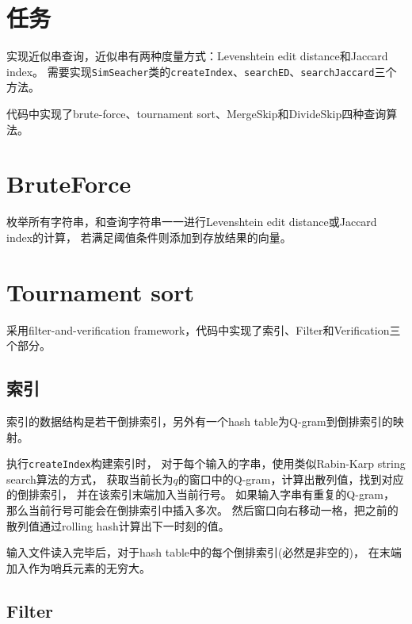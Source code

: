 \title{}
\author{MaskRay}
\maketitle

\section{任务}

实现近似串查询，近似串有两种度量方式：Levenshtein edit distance和Jaccard index。
需要实现\texttt{SimSeacher}类的\texttt{createIndex}、\texttt{searchED}、\texttt{searchJaccard}三个方法。

代码中实现了brute-force、tournament sort、MergeSkip\cite{LLL08}和DivideSkip\cite{LLL08}四种查询算法。

\section{BruteForce}

枚举所有字符串，和查询字符串一一进行Levenshtein edit distance或Jaccard index的计算，
若满足阈值条件则添加到存放结果的向量。

\section{Tournament sort}

采用filter-and-verification framework，代码中实现了索引、Filter和Verification三个部分。

\subsection{索引}

索引的数据结构是若干倒排索引，另外有一个hash table为Q-gram到倒排索引的映射。

执行\texttt{createIndex}构建索引时，
对于每个输入的字串，使用类似Rabin-Karp string search算法的方式，
获取当前长为$q$的窗口中的Q-gram，计算出散列值，找到对应的倒排索引，
并在该索引末端加入当前行号。
如果输入字串有重复的Q-gram，那么当前行号可能会在倒排索引中插入多次。
然后窗口向右移动一格，把之前的散列值通过rolling hash计算出下一时刻的值。

输入文件读入完毕后，对于hash table中的每个倒排索引(必然是非空的)，
在末端加入作为哨兵元素的无穷大。

\subsection{Filter}

